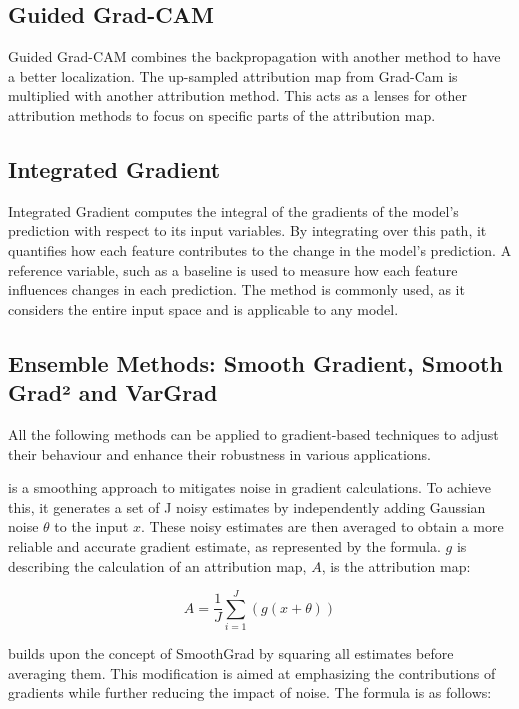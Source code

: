 \subsection{Guided Grad-CAM}

Guided Grad-CAM combines the backpropagation \cite{springenberg2015striving} with another method to have a better localization. The up-sampled attribution map from Grad-Cam is multiplied with another attribution method. This acts as a lenses for other attribution methods to focus on specific parts of the attribution map.

\subsection{Integrated Gradient}
\label{IG}
Integrated Gradient \cite{sundararajan2017axiomatic} computes the integral of the gradients of the model's prediction with respect to its input variables. By integrating over this path, it quantifies how each feature contributes to the change in the model's prediction. A reference variable, such as a baseline is used to measure how each feature influences changes in each prediction. The method is commonly used, as it considers the entire input space and is applicable to any model.

\subsection{Ensemble Methods: Smooth Gradient, Smooth Grad² and VarGrad}

All the following methods can be applied to gradient-based techniques to adjust their behaviour and enhance their robustness in various applications.

 \cite{smilkov2017smoothgrad} is a smoothing approach to mitigates noise in gradient calculations. To achieve this, it generates a set of J noisy estimates by independently adding Gaussian noise $\theta$ to the input $x$. These noisy estimates are then averaged to obtain a more reliable and accurate gradient estimate, as represented by the formula. $g$ is describing the calculation of an attribution map, $A$, is the attribution map:

$$ A = \frac{1}{J}\sum_{i=1}^{J} (g(x+\theta))$$

 \cite{hooker2019benchmark} builds upon the concept of SmoothGrad by squaring all estimates before averaging them. This modification is aimed at emphasizing the contributions of gradients while further reducing the impact of noise. The formula is as follows:

